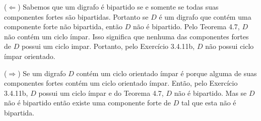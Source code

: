 
($\Leftarrow$) Sabemos que um digrafo é bipartido se e somente se todas suas
componentes fortes são bipartidas. Portanto se $D$ é um digrafo que contém uma
componente forte não bipartida, então $D$ não é bipartido. Pelo Teorema 4.7, $D$
não contém um ciclo ímpar. Isso significa que nenhuma das componentes fortes de
$D$ possui um ciclo impar. Portanto, pelo Exercício 3.4.11b, $D$ não possui ciclo
ímpar orientado.

($\Rightarrow$) Se um digrafo $D$ contém um ciclo orientado ímpar é porque alguma
de suas componentes fortes contém um ciclo orientado ímpar. Então, pelo Exercício
3.4.11b, $D$ possui um ciclo ímpar e do Teorema 4.7, $D$ não é bipartido. Mas se
$D$ não é bipartido então existe uma componente forte de $D$ tal que esta não é
bipartida.

